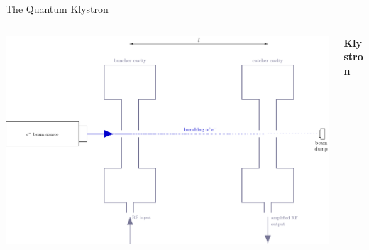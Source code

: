 \documentclass[final]{beamer}
\begin{document}
\begin{frame}[fragile]{}
\begin{columns}[T]
\begin{column}{.49\linewidth}
\begin{block}{\large The Quantum Klystron}
        \begin{columns}
          \begin{column}{0.4\columnwidth}
              \includegraphics[width=\columnwidth]{figures/klystron.pdf}
          \end{column}
          \begin{column}{0.6\columnwidth}\begin{center}
              {\large \textbf{Klystron}}
            \end{center}


\end{column}
\end{columns}
\end{block}
\end{column}
\end{columns}
\end{frame}
\end{document}
